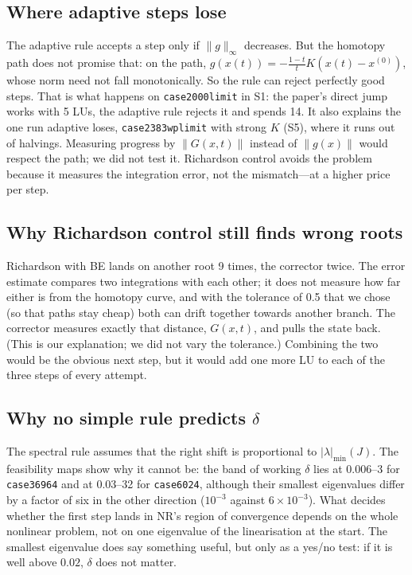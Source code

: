 \documentclass[11pt,a4paper]{article}
\newcommand{\norm}[1]{\lVert #1\rVert}
\newcommand{\ninf}[1]{\lVert #1\rVert_\infty}
\newcommand{\xo}{x^{(0)}}
\newcommand{\code}[1]{\texttt{#1}}
\begin{document}
\subsection{Where adaptive steps lose}\label{sec:adaptive-fail}
The adaptive rule accepts a step only if $\ninf{g}$ decreases. But the homotopy path does not promise that:
on the path, $g(x(t))=-\tfrac{1-t}{t}K(x(t)-\xo)$, whose norm need not fall monotonically. So the rule can
reject perfectly good steps. That is what happens on \code{case2000limit} in S1: the paper's direct jump
works with 5 LUs, the adaptive rule rejects it and spends 14. It also explains the one run adaptive loses,
\code{case2383wplimit} with strong $K$ (S5), where it runs out of halvings. Measuring progress by
$\norm{G(x,t)}$ instead of $\norm{g(x)}$ would respect the path; we did not test it. Richardson control
avoids the problem because it measures the integration error, not the mismatch---at a higher price per step.

\subsection{Why Richardson control still finds wrong roots}
Richardson with BE lands on another root 9 times, the corrector twice. The error estimate compares two
integrations with each other; it does not measure how far either is from the homotopy curve, and with the
tolerance of 0.5 that we chose (so that paths stay cheap) both can drift together towards another branch.
The corrector measures exactly that distance, $G(x,t)$, and pulls the state back. (This is our explanation;
we did not vary the tolerance.) Combining the two would be the obvious next step, but it would add one more LU to each
of the three steps of every attempt.

\subsection{\texorpdfstring{Why no simple rule predicts $\delta$}{Why no simple rule predicts delta}}
The spectral rule assumes that the right shift is proportional to $|\lambda|_{\min}(J)$. The feasibility maps
show why it cannot be: the band of working $\delta$ lies at 0.006--3 for \code{case36964} and at 0.03--32 for
\code{case6024}, although their smallest eigenvalues differ by a factor of six in the other direction
($10^{-3}$ against $6\times10^{-3}$). What decides whether the first step lands in NR's region of
convergence depends on the whole nonlinear problem, not on one eigenvalue of the linearisation at the start.
The smallest eigenvalue does say something useful, but only as a yes/no test: if it is well above
$0.02$, $\delta$ does not matter.
\end{document}
